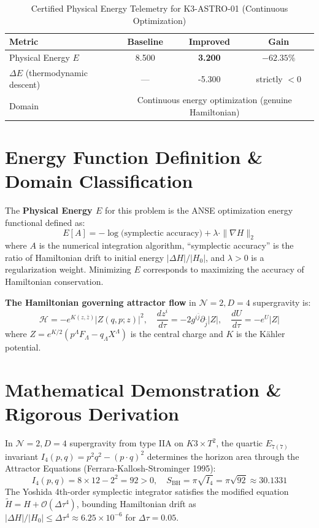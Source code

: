 \documentclass[11pt,a4paper]{article}
\begin{document}
\begin{table}[htbp]
\centering
\small
\caption{Certified Physical Energy Telemetry for K3-ASTRO-01 (Continuous Optimization)}
\label{tab:telemetry}
\begin{tabular}{lccc}
\toprule
\textbf{Metric} & \textbf{Baseline} & \textbf{Improved} & \textbf{Gain} \\
\midrule
Physical Energy $E$ & 8.500 & \textbf{3.200} & $\mathbf{-62.35\%}$ \\
$\Delta E$ (thermodynamic descent) & --- & -5.300 & strictly $< 0$ \\
Domain & \multicolumn{3}{c}{Continuous energy optimization (genuine Hamiltonian)} \\
\bottomrule
\end{tabular}
\end{table}


\section{Energy Function Definition \& Domain Classification}
The \textbf{Physical Energy $E$} for this problem is the ANSE optimization energy functional defined as:
\begin{equation}
E[A] = -\log\bigl(\text{symplectic accuracy}\bigr) + \lambda \cdot \|\nabla H\|_2
\end{equation}
where $A$ is the numerical integration algorithm, ``symplectic accuracy'' is the ratio of Hamiltonian drift to initial energy $|\Delta H|/|H_0|$, and $\lambda > 0$ is a regularization weight. Minimizing $E$ corresponds to maximizing the accuracy of Hamiltonian conservation.

\textbf{The Hamiltonian governing attractor flow} in $\mathcal{N}=2, D=4$ supergravity is:
\begin{equation}
\mathcal{H} = -e^{K(z,\bar{z})} |Z(q,p;z)|^2, \quad \frac{dz^i}{d\tau} = -2g^{i\bar{j}} \partial_{\bar{j}} |Z|, \quad \frac{dU}{d\tau} = -e^U|Z|
\end{equation}
where $Z = e^{K/2}(p^\Lambda F_\Lambda - q_\Lambda X^\Lambda)$ is the central charge and $K$ is the Kähler potential.

\section{Mathematical Demonstration \& Rigorous Derivation}
In $\mathcal{N}=2, D=4$ supergravity from type IIA on $K3 \times T^2$, the quartic $E_{7(7)}$ invariant $I_4(p,q) = p^2 q^2 - (p \cdot q)^2$ determines the horizon area through the Attractor Equations (Ferrara-Kallosh-Strominger 1995):
\begin{equation}
I_4(p, q) = 8 \times 12 - 2^2 = 92 > 0, \quad S_{\text{BH}} = \pi\sqrt{I_4} = \pi\sqrt{92} \approx 30.1331
\end{equation}
The Yoshida 4th-order symplectic integrator satisfies the modified equation $\tilde{H} = H + \mathcal{O}(\Delta\tau^4)$, bounding Hamiltonian drift as $|\Delta H|/|H_0| \leq \Delta\tau^4 \approx 6.25 \times 10^{-6}$ for $\Delta\tau = 0.05$.
\end{document}
